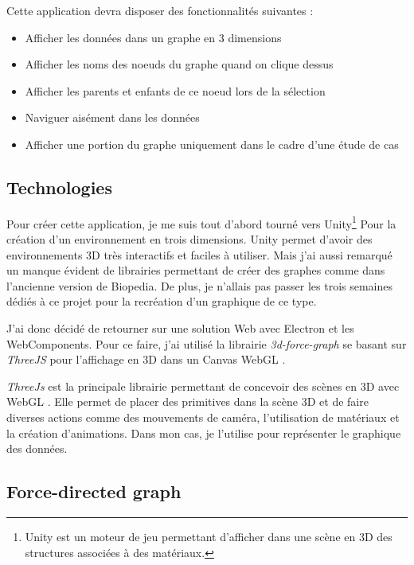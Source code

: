 Cette application devra disposer des fonctionnalités suivantes :

\begin{itemize}
    \item Afficher les données dans un graphe en 3 dimensions
    \item Afficher les noms des noeuds du graphe quand on clique dessus
    \item Afficher les parents et enfants de ce noeud lors de la sélection
    \item Naviguer aisément dans les données
    \item Afficher une portion du graphe uniquement dans le cadre d'une étude de cas
\end{itemize}

\subsection{Technologies}
\label{biomerieuxBiopediaTéchnologies}

Pour créer cette application, je me suis tout d'abord tourné vers Unity\footnote{Unity est un moteur de jeu permettant d'afficher dans une scène en 3D des structures associées à des matériaux.} Pour la création d'un environnement en trois dimensions.
Unity permet d'avoir des environnements 3D très interactifs et faciles à utiliser.
Mais j'ai aussi remarqué un manque évident de librairies permettant de créer des graphes comme dans l'ancienne version de Biopedia.
De plus, je n'allais pas passer les trois semaines dédiés à ce projet pour la recréation d'un graphique de ce type.

J'ai donc décidé de retourner sur une solution Web avec Electron et les WebComponents.
Pour ce faire, j'ai utilisé la librairie \emph{3d-force-graph} se basant sur \emph{ThreeJS} pour l'affichage en 3D dans un Canvas WebGL .

\emph{ThreeJs} est la principale librairie permettant de concevoir des scènes en 3D avec WebGL .
Elle permet de placer des primitives dans la scène 3D et de faire diverses actions comme des mouvements de caméra, l'utilisation de matériaux et la création d'animations.
Dans mon cas, je l'utilise pour représenter le graphique des données.

\subsection{Force-directed graph}
\label{biomerieuxBiopediaForceDirectedGraph}

